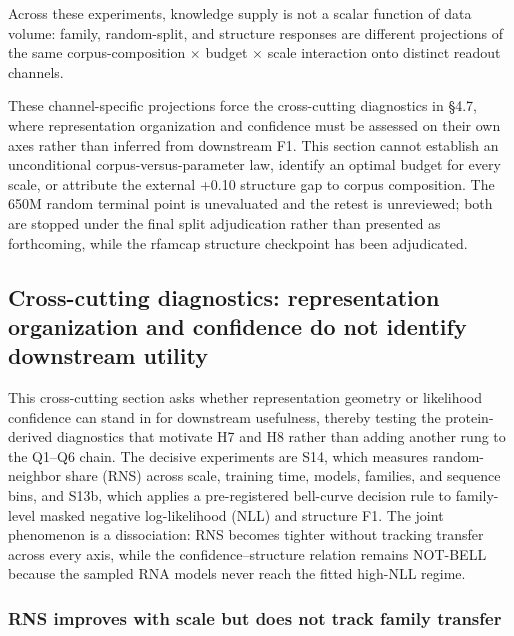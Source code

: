 Across these experiments, knowledge supply is not a scalar function of data volume: family, random-split, and structure responses are different projections of the same corpus-composition \(\times\) budget \(\times\) scale interaction onto distinct readout channels.

These channel-specific projections force the cross-cutting diagnostics in \S4.7, where representation organization and confidence must be assessed on their own axes rather than inferred from downstream F1. This section cannot establish an unconditional corpus-versus-parameter law, identify an optimal budget for every scale, or attribute the external +0.10 structure gap to corpus composition. The 650M random terminal point is unevaluated and the retest is unreviewed; both are stopped under the final split adjudication rather than presented as forthcoming, while the rfamcap structure checkpoint has been adjudicated.

\hypertarget{cross-cutting-diagnostics-representation-organization-and-confidence-do-not-identify-downstream-utility}{%
\subsection{Cross-cutting diagnostics: representation organization and confidence do not identify downstream utility}\label{cross-cutting-diagnostics-representation-organization-and-confidence-do-not-identify-downstream-utility}}

This cross-cutting section asks whether representation geometry or likelihood confidence can stand in for downstream usefulness, thereby testing the protein-derived diagnostics that motivate H7 and H8 rather than adding another rung to the Q1--Q6 chain. The decisive experiments are S14, which measures random-neighbor share (RNS) across scale, training time, models, families, and sequence bins, and S13b, which applies a pre-registered bell-curve decision rule to family-level masked negative log-likelihood (NLL) and structure F1. The joint phenomenon is a dissociation: RNS becomes tighter without tracking transfer across every axis, while the confidence--structure relation remains NOT-BELL because the sampled RNA models never reach the fitted high-NLL regime.

\hypertarget{rns-improves-with-scale-but-does-not-track-family-transfer}{%
\subsubsection{RNS improves with scale but does not track family transfer}\label{rns-improves-with-scale-but-does-not-track-family-transfer}}

